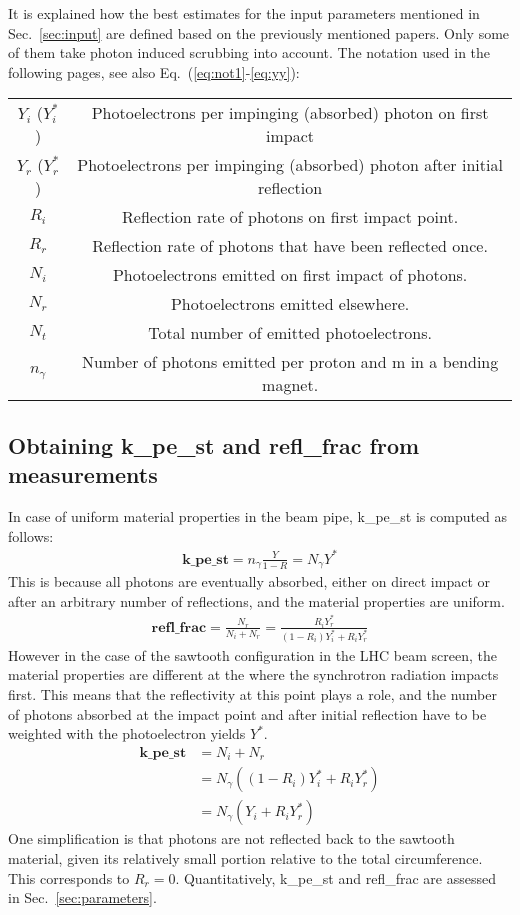 
It is explained how the best estimates for the input parameters mentioned in Sec.~\ref{sec:input} are defined based on the previously mentioned papers.
Only some of them take photon induced scrubbing into account.
The notation used in the following pages, see also Eq.~(\ref{eq:not1}-\ref{eq:yy}):
\begin{center}
    \begin{tabular}{cc}
        $Y_i$ ($Y_i^*$) & Photoelectrons per impinging (absorbed) photon on first impact \\
        $Y_r$ ($Y_r^*$)& Photoelectrons per impinging (absorbed) photon after initial reflection \\
        $R_i$ & Reflection rate of photons on first impact point. \\
        $R_r$ & Reflection rate of photons that have been reflected once. \\
        $N_i$ & Photoelectrons emitted on first impact of photons. \\
        $N_r$ & Photoelectrons emitted elsewhere. \\
        $N_t$ & Total number of emitted photoelectrons.\\
        $n_\gamma$ & Number of photons emitted per proton and m in a bending magnet.
    \end{tabular}
\end{center}


\subsection{Obtaining k\_pe\_st and refl\_frac from measurements}

In case of uniform material properties in the beam pipe, k\_pe\_st is computed as follows:
\begin{align}
    \textbf{k\_pe\_st} = n_\gamma \frac{Y}{1-R} = N_\gamma Y^*
\end{align}
This is because all photons are eventually absorbed, either on direct impact or after an arbitrary number of reflections, and the material properties are uniform.
\begin{align}
    \textbf{refl\_frac} = \frac{N_r}{N_i+N_r} = \frac{R_iY^*_r}{(1-R_i)Y_i^* + R_iY^*_r}
\end{align}
However in the case of the sawtooth configuration in the LHC beam screen, the material properties are different at the where the synchrotron radiation impacts first.
This means that the reflectivity at this point plays a role, and the number of photons absorbed at the impact point and after initial reflection have to be weighted with the photoelectron yields $Y^*$.
\begin{align}
    \textbf{k\_pe\_st} &= N_i + N_r
    \\
    &= N_\gamma \left( (1-R_i)Y_i^* + R_iY^*_r \right)
    \\
    &= N_\gamma \left( Y_i + R_iY^*_r \right)
    \label{eq:parts}
\end{align}
One simplification is that photons are not reflected back to the sawtooth material, given its relatively small portion relative to the total circumference.
This corresponds to $R_r=0$.
Quantitatively, k\_pe\_st and refl\_frac are assessed in Sec.~\ref{sec:parameters}.

